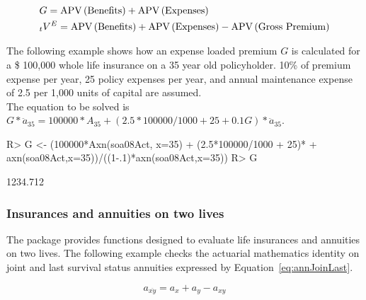 \documentclass[nojss]{jss}
\begin{document}
\begin{equation}
\begin{gathered}
  G = \text{APV}\left(\text{Benefits}\right) + \text{APV}\left(\text{Expenses}\right) \hfill \\
 {}_{t}V^{E} = \text{APV} \left(\text{Benefits}\right) + \text{APV} \left(\text{Expenses}\right) - \text{APV} \left(\text{Gross Premium}\right)	\hfill \\ 
\end{gathered}
\label{eq:ExpenseLoad}
\end{equation}

The following example shows how an expense loaded premium $G$ is calculated for a \$ 100,000 whole life insurance on a 35 year old policyholder. 10\% of premium expense per year, 25 policy expenses per year, and annual maintenance expense of 2.5 per
1,000 units of capital are assumed.\\

The equation to be solved is $G * \ddot{a}_{35} = 100000 * A_{35} + \left( 2.5*100000/1000 + 25 + 0.1 G \right) * \ddot{a}_{35}$.
\begin{Schunk}
\begin{Sinput}
R> G <- (100000*Axn(soa08Act, x=35) + (2.5*100000/1000 + 25)*
+  			axn(soa08Act,x=35))/((1-.1)*axn(soa08Act,x=35))
R> G
\end{Sinput}
\begin{Soutput}
[1] 1234.712
\end{Soutput}
\end{Schunk}



\subsubsection{Insurances and annuities on two lives}\label{sec:ssstwoheads}

The package provides functions designed to evaluate life insurances and annuities
on two lives.
The following example checks the actuarial mathematics identity on joint and last survival status annuities 
expressed by Equation~\ref{eq:annJoinLast}.

\begin{equation}
  a_{\overline{xy}}= a_{x} + a_{y} - a_{xy}
\label{eq:annJoinLast}
\end{equation}
\end{document}
